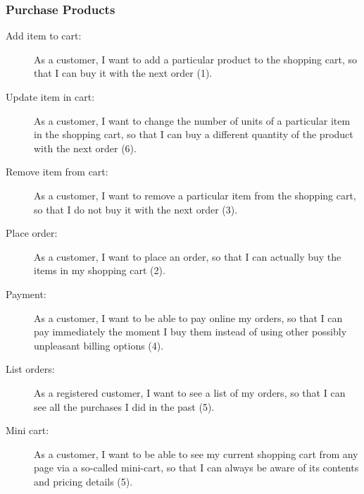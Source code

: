 \subsubsection{Purchase Products}
\begin{description}
	\item[Add item to cart:] As a customer, I want to add a particular product to the shopping cart, so that I can buy it with the next order (1).
	\item[Update item in cart:] As a customer, I want to change the number of units of a particular item in the shopping cart, so that I can buy a different quantity of the product with the next order (6).
	\item[Remove item from cart:] As a customer, I want to remove a particular item from the shopping cart, so that I do not buy it with the next order (3).
	\item[Place order:] As a customer, I want to place an order, so that I can actually buy the items in my shopping cart (2). 
	\item[Payment:] As a customer, I want to be able to pay online my orders, so that I can pay immediately the moment I buy them instead of using other possibly unpleasant billing options (4). 
	\item[List orders:] As a registered customer, I want to see a list of my orders, so that I can see all the purchases I did in the past (5). 
	\item[Mini cart:] As a customer, I want to be able to see my current shopping cart from any page via a so-called mini-cart, so that I can always be aware of its contents and pricing details (5).  
\end{description}	
  
